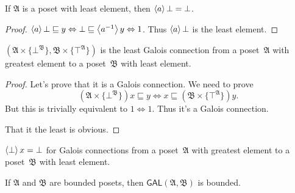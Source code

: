 
\begin{prop}\label{a-bot}
If $\mathfrak{A}$ is a poset with least element, then $\left\langle a\right\rangle\bot=\bot$.
\end{prop}

\begin{proof}
$\left\langle a\right\rangle\bot\sqsubseteq y\Leftrightarrow \bot\sqsubseteq\left\langle a^{-1}\right\rangle y\Leftrightarrow 1$.
Thus $\left\langle a\right\rangle\bot$ is the least element.
\end{proof}

\begin{prop}
$(\mathfrak{A}\times\{\bot^\mathfrak{B}\}, \mathfrak{B}\times\{\top^\mathfrak{A}\})$ is the least Galois connection from
a poset~$\mathfrak{A}$ with greatest element to a poset~$\mathfrak{B}$ with least element.
\end{prop}

\begin{proof}
Let's prove that it is a Galois connection. We need to prove
\[ (\mathfrak{A}\times\{\bot^\mathfrak{B}\})x\sqsubseteq y \Leftrightarrow x\sqsubseteq (\mathfrak{B}\times\{\top^\mathfrak{A}\})y. \]
But this is trivially equivalent to $1\Leftrightarrow 1$. Thus it's a Galois connection.

That it the least is obvious.
\end{proof}

\begin{cor}
$\left\langle \bot\right\rangle x=\bot$ for Galois connections from
a poset~$\mathfrak{A}$ with greatest element to a poset~$\mathfrak{B}$ with least element.
\end{cor}

\begin{thm}\label{gal-bound}
If $\mathfrak{A}$ and $\mathfrak{B}$ are bounded posets, then $\mathsf{GAL}(\mathfrak{A}, \mathfrak{B})$ is bounded.
\end{thm}

